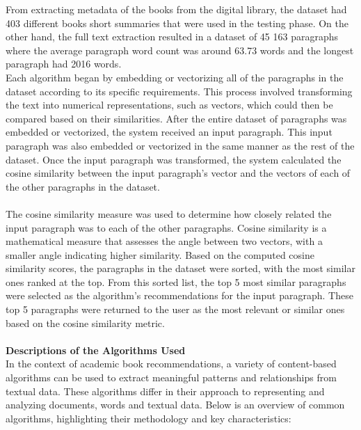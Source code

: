 \documentclass[10pt, oneside,english,hidelinks,a4paper]{article}
\begin{document}
\begin{multicols}{2}
From extracting metadata of the books from the digital library, the dataset had 403 different books short summaries that were used in the testing phase. On the other hand, the full text extraction resulted in a dataset of 45 163 paragraphs where the average paragraph word count was around 63.73 words and the longest paragraph had 2016 words.\\
Each algorithm began by embedding or vectorizing all of the paragraphs in the dataset according to its specific requirements. This process involved transforming the text into numerical representations, such as vectors, which could then be compared based on their similarities. After the entire dataset of paragraphs was embedded or vectorized, the system received an input paragraph. This input paragraph was also embedded or vectorized in the same manner as the rest of the dataset. Once the input paragraph was transformed, the system calculated the cosine similarity between the input paragraph’s vector and the vectors of each of the other paragraphs in the dataset.\\\\
The cosine similarity measure was used to determine how closely related the input paragraph was to each of the other paragraphs. Cosine similarity is a mathematical measure that assesses the angle between two vectors, with a smaller angle indicating higher similarity. Based on the computed cosine similarity scores, the paragraphs in the dataset were sorted, with the most similar ones ranked at the top. From this sorted list, the top 5 most similar paragraphs were selected as the algorithm's recommendations for the input paragraph. These top 5 paragraphs were returned to the user as the most relevant or similar ones based on the cosine similarity metric.\\\\
%
%
\textbf{Descriptions of the Algorithms Used}\\
In the context of academic book recommendations, a variety of content-based algorithms can be used to extract meaningful patterns and relationships from textual data. These algorithms differ in their approach to representing and analyzing documents, words and textual data. Below is an overview of common algorithms, highlighting their methodology and key characteristics:\\\\

\end{multicols}
\end{document}
